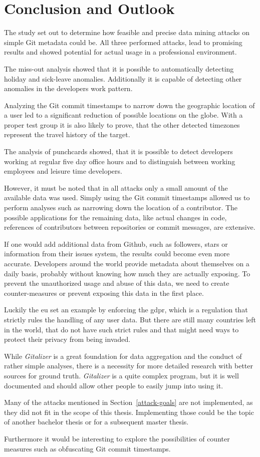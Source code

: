 \chapter{Conclusion and Outlook}

The study set out to determine how feasible and precise data mining attacks on simple Git metadata could be.
All three performed attacks, lead to promising results and showed potential for actual usage in a professional environment.

The miss-out analysis showed that it is possible to automatically detecting holiday and sick-leave anomalies.
Additionally it is capable of detecting other anomalies in the developers work pattern.

Analyzing the Git commit timestamps to narrow down the geographic location of a user led to a significant reduction of possible locations on the globe.
With a proper test group it is also likely to prove, that the other detected timezones represent the travel history of the target.

The analysis of punchcards showed, that it is possible to detect developers working at regular five day office hours and to distinguish between working employees and leisure time developers.

However, it must be noted that in all attacks only a small amount of the available data was used.
Simply using the Git commit timestamps allowed us to perform analyses such as narrowing down the location of a contributor.
The possible applications for the remaining data, like actual changes in code, references of contributors between repositories or commit messages, are extensive.

If one would add additional data from Github, such as followers, stars or information from their issues system, the results could become even more accurate.
Developers around the world provide metadata about themselves on a daily basis, probably without knowing how much they are actually exposing.
To prevent the unauthorized usage and abuse of this data, we need to create counter-measures or prevent exposing this data in the first place.

Luckily the \ac{eu} set an example by enforcing the \ac{gdpr}, which is a regulation that strictly rules the handling of any user data.
But there are still many countries left in the world, that do not have such strict rules and that might need ways to protect their privacy from being invaded.

While \emph{Gitalizer} is a great foundation for data aggregation and the conduct of rather simple analyses, there is a necessity for more detailed research with better sources for ground truth.
\emph{Gitalizer} is a quite complex program, but it is well documented and should allow other people to easily jump into using it.

Many of the attacks mentioned in Section~\ref{attack-goals} are not implemented, as they did not fit in the scope of this thesis.
Implementing those could be the topic of another bachelor thesis or for a subsequent master thesis.

Furthermore it would be interesting to explore the possibilities of counter measures such as obfuscating Git commit timestamps.
